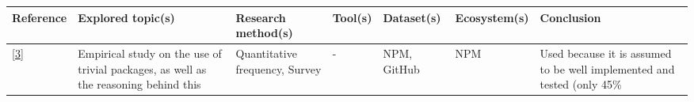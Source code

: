 \documentclass[]{book}
\begin{document}
\begin{longtable}[]{@{}lllllll@{}}
\toprule
\begin{minipage}[b]{0.09\columnwidth}\raggedright\strut
Reference\strut
\end{minipage} & \begin{minipage}[b]{0.16\columnwidth}\raggedright\strut
Explored topic(s)\strut
\end{minipage} & \begin{minipage}[b]{0.17\columnwidth}\raggedright\strut
Research method(s)\strut
\end{minipage} & \begin{minipage}[b]{0.07\columnwidth}\raggedright\strut
Tool(s)\strut
\end{minipage} & \begin{minipage}[b]{0.10\columnwidth}\raggedright\strut
Dataset(s)\strut
\end{minipage} & \begin{minipage}[b]{0.12\columnwidth}\raggedright\strut
Ecosystem(s)\strut
\end{minipage} & \begin{minipage}[b]{0.10\columnwidth}\raggedright\strut
Conclusion\strut
\end{minipage}\tabularnewline
\midrule
\endhead
\begin{minipage}[t]{0.09\columnwidth}\raggedright\strut
{[}\protect\hyperlink{ref-Abdalkareem2017}{3}{]}\strut
\end{minipage} & \begin{minipage}[t]{0.16\columnwidth}\raggedright\strut
Empirical study on the use of trivial packages, as well as the reasoning
behind this\strut
\end{minipage} & \begin{minipage}[t]{0.17\columnwidth}\raggedright\strut
Quantitative frequency, Survey\strut
\end{minipage} & \begin{minipage}[t]{0.07\columnwidth}\raggedright\strut
-\strut
\end{minipage} & \begin{minipage}[t]{0.10\columnwidth}\raggedright\strut
NPM, GitHub\strut
\end{minipage} & \begin{minipage}[t]{0.12\columnwidth}\raggedright\strut
NPM\strut
\end{minipage} & \begin{minipage}[t]{0.10\columnwidth}\raggedright\strut
Used because it is assumed to be well implemented and tested (only 45\%

\end{minipage}
\end{longtable}
\end{document}
